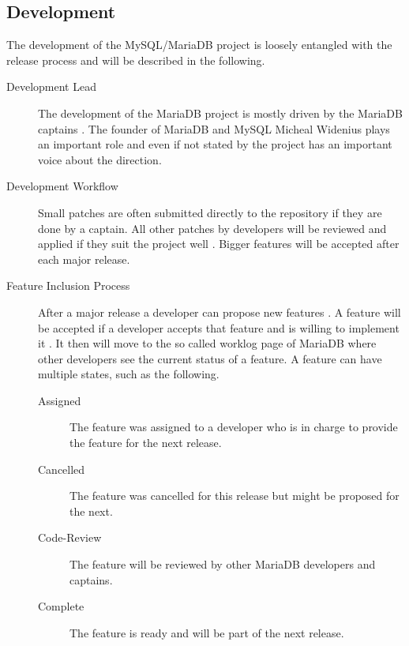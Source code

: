 \subsection{Development}

The development of the MySQL/MariaDB project is loosely entangled with the
release process and will be described in the following.

\begin{description}

  \item[Development Lead] The development of the MariaDB project is mostly
    driven by the MariaDB captains \cite{MySQLContributing,MySQLDevelopers}.
    The founder of MariaDB and MySQL Micheal Widenius plays an important role
    and even if not stated by the project has an important voice about the
    direction.

  \item[Development Workflow] Small patches are often submitted directly to
    the repository if they are done by a captain. All other patches by
    developers will be reviewed and applied if they suit the project well
    \cite{MySQLRoadmap,MySQLPlans}. Bigger features will be accepted after
    each major release.

  \item[Feature Inclusion Process] After a major release a developer can
    propose new features \cite{MySQLPlans}. A feature will be accepted if a
    developer accepts that feature and is willing to implement it
    \cite{MySQLContributingCode,MySQLContributing}. It then will move to the
    so called worklog page of MariaDB where other developers see the current
    status of a feature. A feature can have multiple states, such as the
    following.

    \begin{description}

      \item[Assigned] The feature was assigned to a developer who is in
        charge to provide the feature for the next release.

      \item[Cancelled] The feature was cancelled for this release but might
        be proposed for the next.

      \item[Code-Review] The feature will be reviewed by other MariaDB
        developers and captains.

      \item[Complete] The feature is ready and will be part of the next
        release.


\end{description}
\end{description}
